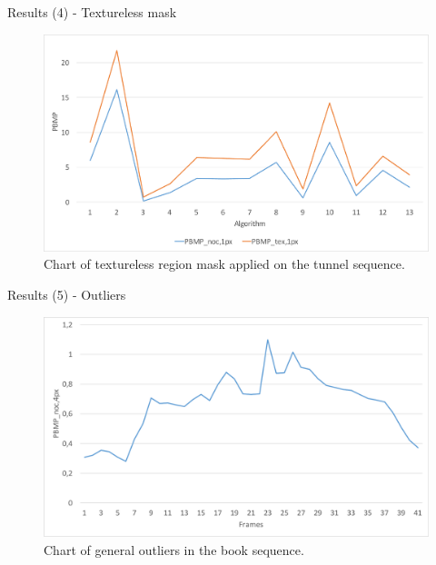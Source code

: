 \documentclass[10pt]{beamer}
\begin{document}
\begin{frame}[fragile]{Results (4) - Textureless mask}
  \begin{figure}[h!]
  \centering
  \includegraphics[width=1.0\textwidth]{../paper/src/images/evaluation/plots/05-tunnel-pbmp-tex-1.pdf}
  \caption{Chart of textureless region mask applied on the tunnel sequence.}
  \end{figure}
\end{frame}

\begin{frame}[fragile]{Results (5) - Outliers}
  \begin{figure}[h!]
  \centering
  \includegraphics[width=1.0\textwidth]{../paper/src/images/evaluation/plots/01-book-general-outliers.pdf}
  \caption{Chart of general outliers in the book sequence.}
  \end{figure}
\end{frame}
\end{document}
